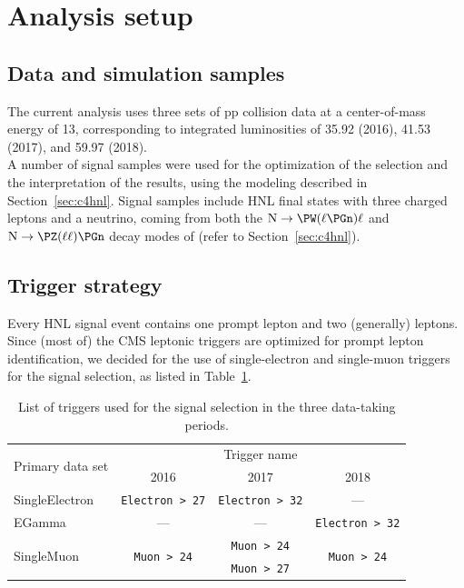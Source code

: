 \section{Analysis setup}
\subsection{Data and simulation samples}
The current analysis uses three sets of pp collision data at a
center-of-mass energy of 13\TeV, corresponding to integrated
luminosities of 35.92 \fbinv (2016), 41.53 \fbinv (2017), and 59.97 \fbinv
(2018). \\
A number of signal samples were used for the optimization of the
selection and the interpretation of the results, using the modeling
described in Section~\ref{sec:c4hnl}.
Signal samples include HNL final states with three charged leptons and a
neutrino, coming from both the
$\hnl\to\PW(\ell\PGn)\ell$ and $\hnl\to\PZ(\ell\ell)\PGn$ decay modes
of \hnl (refer to Section~\ref{sec:c4hnl}).

\subsection{Trigger strategy}\label{sec:trigger}
Every HNL signal event contains one prompt lepton and two (generally)
\displ leptons. Since (most of) the CMS leptonic triggers are
optimized for prompt lepton identification,
we decided for the use of single-electron and single-muon triggers for the
signal selection, as listed in Table~\ref{tab:sgnlTriggers}.
\begin{table}[h]
{\small
  \begin{center}
    \caption{\label{tab:sgnlTriggers} List of triggers used for the
      signal selection in the three data-taking periods.}
      \begin{tabular}{|l|c|c|c|}
      \hline
      \multirow{2}{*}{Primary data set} & \multicolumn{3}{c|}{Trigger name}\\
      \cline{2-4}
      & 2016 & 2017 & 2018 \\
      \hline\hline
      SingleElectron & \texttt{\scriptsize Electron > 27} & \texttt{\scriptsize Electron > 32} & --- \\
      \hline
      EGamma         & --- & --- & \texttt{\scriptsize Electron > 32} \\
      \hline
      \multirow{2}{*}{SingleMuon} & \multirow{2}{*}{\texttt{\scriptsize Muon > 24}} & \texttt{\scriptsize Muon > 24} & \multirow{2}{*}{\texttt{\scriptsize Muon > 24}} \\
      & & \texttt{\scriptsize Muon > 27} & \\
      \hline
    \end{tabular}    
  \end{center}}
\end{table}

